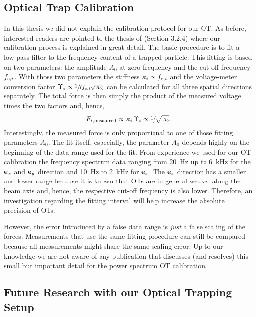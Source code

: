 \subsection{Optical Trap Calibration}

In this thesis we did not explain the calibration protocol for our OT. As 
before, interested readers are pointed to the thesis of  
(Section 3.2.4) where our calibration process is explained in great detail. The 
basic procedure is to fit a low-pass filter to the frequency content of a 
trapped particle. This fitting is based on two parameters: the amplitude 
$A_{0}$ at zero frequency and the cut off frequency $f_{\mathrm{c},i}$. With those two 
parameters the stiffness $\kappa_{i}\propto f_{\mathrm{c},i}$ and the voltage-meter 
conversion factor $\Upsilon_{i}\propto \sfrac{1}{(f_{\mathrm{c},i}\sqrt{A_{0}} )}$ can 
be calculated for all three spatial directions separately. The total force is 
then simply the product of the measured voltage times the two factors and, 
hence, \begin{equation}
  F_{i,\mathrm{measured}}\propto \kappa_{i}\,\Upsilon_{i}\propto 
  \sfrac{1}{\sqrt{A_{0}}}.
\end{equation}
Interestingly, the measured force is only proportional to one of those fitting 
parameters $A_{0}$. The fit itself, especially, the parameter $A_{0}$ depends 
highly on the beginning of the data range used for the fit. From experience we 
used for our OT calibration the frequency spectrum data ranging from 
\SI{20}{\hertz} up to \SI{6}{\kilo\hertz} for the $\vb{e}_{x}$ and $\vb{e}_{y}$ direction and 
\SI{10}{\hertz} to \SI{2}{\kilo\hertz} for $\vb{e}_{z}$. The $\vb{e}_{z}$ direction has a 
smaller and lower range because it is known that OTs are in general weaker 
along the beam axis and, hence, the respective cut-off frequency is also lower. 
Therefore, an investigation regarding the fitting interval will help increase 
the absolute precision of OTs.

However, the error introduced by a false data range is \emph{just} a false 
scaling of the forces. Measurements that use the same fitting procedure can 
still be compared because all measurements might share the same scaling error. 
Up to our knowledge we are not aware of any publication that discusses (and 
resolves) this small but important detail for the power spectrum OT 
calibration.

\subsection{Future Research with our Optical Trapping Setup}

